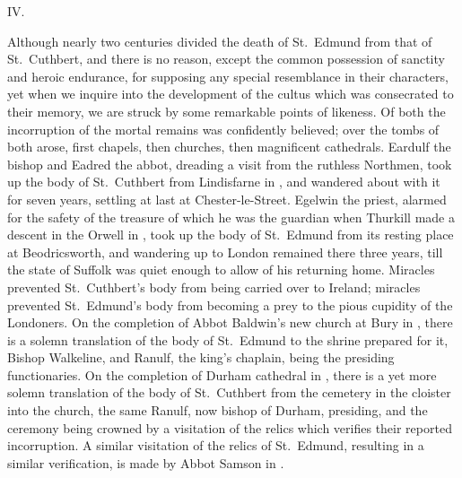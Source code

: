 \documentclass[10pt]{book}
\begin{document}
{\vspace{.3cm}
\begin{center}
IV.
\end{center}
\noindent Although nearly two centuries divided the death of St.\ Edmund from that of St.\ Cuthbert, and there is no reason, except the common possession of sanctity and heroic endurance, for supposing any special resemblance in their characters, yet when we inquire into the development of the cultus which was consecrated to their memory, we are struck by some remarkable points of likeness. Of both the incorruption of the mortal remains was confidently believed; over the tombs of both arose, first chapels, then churches, then magnificent cathedrals. Eardulf the bishop and Eadred the abbot, dreading a visit from the ruthless Northmen, took up the body of St.\ Cuthbert from Lindisfarne in , and wandered about with it for seven years, settling at last at Chester-le-Street. Egelwin the priest, alarmed for the safety of the treasure of which he was the guardian when Thurkill made a descent in the Orwell in , took up the body of St.\ Edmund from its resting place at Beodricsworth, and wandering up to London remained there three years, till the state of Suffolk was quiet enough to allow of his returning home. Miracles prevented St.\ Cuthbert's body from being carried over to Ireland; miracles prevented St.\ Edmund's body from becoming a prey to the pious cupidity of the Londoners. On the completion of Abbot Baldwin's new church at Bury in , there is a solemn translation of the body of St.\ Edmund to the shrine prepared for it, Bishop Walkeline, and Ranulf, the king's chaplain, being the presiding functionaries. On the completion of Durham cathedral in , there is a yet more solemn translation of the body of St.\ Cuthbert from the cemetery in the cloister into the church, the same Ranulf, now bishop of Durham, presiding, and the ceremony being crowned by a visitation of the relics which verifies their reported incorruption. A similar visitation of the relics of St.\ Edmund, resulting in a similar verification, is made by Abbot Samson in .

}
\end{document}
